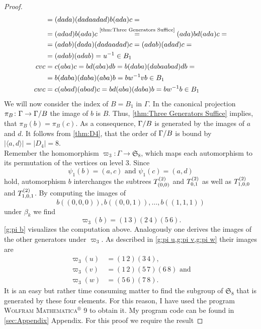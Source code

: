 \begin{proof}
\begin{align*}
	&=(dada)(dadaadad)b(ada)c=\\
	&=(adad)b(ada)c\overset{\text{\cref{thm:Three Generators Suffice}}}{=}(ada)bd(ada)c=\\
	&=(adab)(dada)(dadaadad)c=(adab)(adad)c=\\
	&=(adab)(adab)=u^{-1}\in B_1\\
cvc	&=c(aba)c=bd(aba)db=b(daba)(dabaabad)db=\\
	&=b(daba)(daba)(aba)b=bw^{-1}vb\in B_1\\
cwc	&=c(abad)(abad)c=bd(aba)(daba)b=bw^{-1}b\in B_1
\end{align*}
We will now consider the index of $B=B_1$ in $\Gamma$. In the canonical projection $\pi_B\colon\Gamma\to\nicefrac{\Gamma}{B}$ the image of $b$ is $B$. Thus, \cref{thm:Three Generators Suffice} implies, that $\pi_B(b)=\pi_B(c)$. As a consequence, $\nicefrac{\Gamma}{B}$ is generated by the images of $a$ and $d$. It follows from \cref{thm:D4}, that the order of $\nicefrac{\Gamma}{B}$ is bound by $\lvert\langle a,d\rangle\rvert=\lvert D_4\rvert=8$.\\
Remember the homomorphism $\varpi_3\colon\Gamma\to\mathfrak{S}_8$, which maps each automorphism to its permutation of the vertices on level 3. Since
\begin{equation*}
\psi_1(b)=(a,c)\text{ and }\psi_1(c)=(a,d)
\end{equation*}
hold, automorphism $b$ interchanges the subtrees $\ST{(0,0)}$ and $\ST{0,1}$ as well as $\ST{1,0,0}$ and $\ST{1,0,1}$. By computing the images of 
\begin{equation*}
b((0,0,0)),b((0,0,1)),\ldots,b((1,1,1))
\end{equation*}
 under $\beta_k$ we find
\begin{equation*}
\varpi_3(b)=(1\,3)(2\,4)(5\,6).
\end{equation*}
\cref{g:pi b} visualizes the computation above. Analogously one derives the images of the other generators under $\varpi_3$. As described in \cref{g:pi u,g:pi v,g:pi w} their images are
\begin{align*}
\varpi_3(u)	&=(1\,2)(3\,4),\\
\varpi_3(v)	&=(1\,2)(5\,7)(6\,8)\text{ and}\\
\varpi_3(w)	&=(5\,6)(7\,8).
\end{align*}
It is an easy but rather time consuming matter to find the subgroup of $\mathfrak{S}_8$ that is generated by these four elements. For this reason, I have used the program \textsc{Wolfram Mathematica$^\circledR$ 9} to obtain it. My program code can be found in \ref{sec:Appendix} Appendix. For this proof we require the result

\end{proof}
